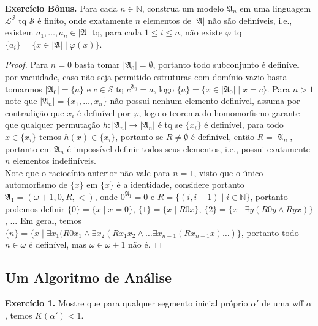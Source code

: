 \documentclass[11pt]{article}
\newcommand{\mc}[1]{\mathcal{#1}}
\newcommand{\mf}[1]{\mathfrak{#1}}
\newcommand{\mbb}[1]{\mathbb{#1}}
\newcommand{\subs}[2]{
    \setcounter{subsection}{#1 - 1}
    \subsection{#2}
    }
\begin{document}
\begin{shaded}
\textbf{Exercício Bônus.} Para cada $n\in\mbb{N}$, construa um modelo $\mf{A}_n$ em uma linguagem $\mc{L}^\mc{S}$ tq $\mc{S}$ é finito, onde exatamente $n$ elementos de $|\mf{A}|$ não são definíveis, i.e., existem $a_1,\dots,a_n\in|\mf{A}|$ tq, para cada $1\leq i\leq n$, não existe $\varphi$ tq $\{a_i\}=\{x\in|\mf{A}|\mid\varphi(x)\}$.
\end{shaded}

\begin{proof}
    Para $n=0$ basta tomar $|\mf{A}_0|=\emptyset$, portanto todo subconjunto é definível por vacuidade, caso não seja permitido estruturas com domínio vazio basta tomarmos $|\mf{A}_0|=\{a\}$ e $c\in\mc{S}$ tq $c^{\mf{A}_0}=a$, logo $\{a\}=\{x\in|\mf{A}_0|\mid x=c\}$. Para $n>1$ note que $|\mf{A}_n|=\{x_1,\dots,x_n\}$ não possui nenhum elemento definível, assuma por contradição que $x_i$ é definível por $\varphi$, logo o teorema do homomorfismo garante que qualquer permutação $h:|\mf{A}_n|\to|\mf{A}_n|$ é tq se $\{x_i\}$ é definível, para todo $x\in\{x_i\}$ temos $h(x)\in\{x_i\}$, portanto se $R\neq\emptyset$ é definível, então $R=|\mf{A}_n|$, portanto em $\mf{A}_n$ é impossível definir todos seus elementos, i.e., possui exatamente $n$ elementos indefiníveis.\\
    Note que o raciocínio anterior não vale para $n=1$, visto que o único automorfismo de $\{x\}$ em $\{x\}$ é a identidade, considere portanto $\mf{A}_1=(\omega+1,0,R,<)$, onde $0^{\mf{A}_1}=0$ e $R=\{(i,i+1)\mid i\in\mbb{N}\}$, portanto podemos definir $\{0\}=\{x\mid x=0\}$, $\{1\}=\{x\mid R0x\}$, $\{2\}=\{x\mid \exists y(R0y\wedge Ryx)\}$, ... Em geral, temos $\{n\}=\{x\mid\exists x_1(R0x_1\wedge\exists x_2(Rx_1x_2\wedge\dots\exists x_{n-1}(Rx_{n-1}x)\dots)\}$, portanto todo $n\in\omega$ é definível, mas $\omega\in\omega+1$ não é.
\end{proof}

\subs{3}{Um Algoritmo de Análise}

\begin{shaded}
\textbf{Exercício 1.} Mostre que para qualquer segmento inicial próprio $\alpha'$ de uma wff $\alpha$, temos $K(\alpha')<1$.
\end{shaded}
\end{document}
